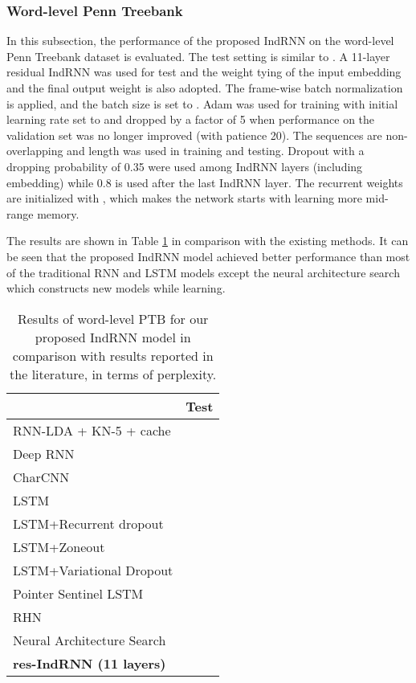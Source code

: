 \documentclass[10pt,twocolumn,letterpaper]{article}
\begin{document}
\subsubsection{Word-level Penn Treebank}
In this subsection, the performance of the proposed IndRNN on the word-level Penn Treebank dataset is evaluated. The test setting is similar to \cite{krueger2016zoneout}. A 11-layer residual IndRNN was used for test and the weight tying \cite{inan2016tying,press2016using} of the input embedding and the final output weight is also adopted. The frame-wise batch normalization \cite{laurent2016batch} is applied, and the batch size is set to . Adam was used for training with initial learning rate set to  and dropped by a factor of 5 when performance on the validation set was no longer improved (with patience 20). The sequences are non-overlapping and length  was used in training and testing. Dropout \cite{gal2016theoretically} with a dropping probability of 0.35 were used among IndRNN layers (including embedding) while 0.8 is used after the last IndRNN layer. The recurrent weights are initialized with , which makes the network starts with learning more mid-range memory.

The results are shown in Table \ref{result_wPTB} in comparison with the existing methods. It can be seen that the proposed IndRNN model achieved better performance than most of the traditional RNN and LSTM models except the neural architecture search \cite{zoph2016neural} which constructs new models while learning. 

\begin{table}
\centering
\tabcolsep=12pt
\caption{Results of word-level PTB for our proposed IndRNN model in comparison with results reported in the literature, in terms of perplexity.}\label{result_wPTB}
\begin{tabular}{l c}
  \hline
   & Test \\\hline
  RNN-LDA + KN-5 + cache \cite{mikolov2012context}  &  \\
  Deep RNN \cite{pascanu2013construct}  &  \\
  CharCNN \cite{kim2016character}  &  \\
  LSTM \cite{krueger2016zoneout}  &  \\
  LSTM+Recurrent dropout \cite{semeniuta2016recurrent} &  \\  
  LSTM+Zoneout \cite{krueger2016zoneout} &   \\
  LSTM+Variational Dropout \cite{gal2016theoretically} &  \\
  Pointer Sentinel LSTM \cite{merity2016pointer} &  \\
  RHN \cite{zilly2016recurrent} &  \\
  Neural Architecture Search \cite{zoph2016neural} &  \\
  \hline  
  \textbf{res-IndRNN (11 layers)} &  \\
  \hline
  \end{tabular}
\end{table}
\end{document}
